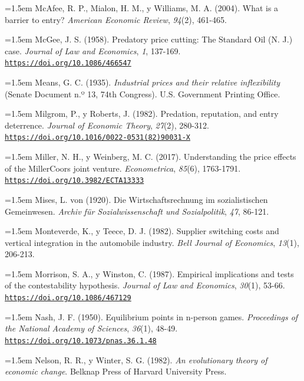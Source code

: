 \documentclass[10pt,a4paper]{article}
\begin{document}
\noindent\hangindent=1.5em McAfee, R. P., Mialon, H. M., y Williams, M. A. (2004). What is a barrier to entry? \textit{American Economic Review}, \textit{94}(2), 461-465.

\noindent\hangindent=1.5em McGee, J. S. (1958). Predatory price cutting: The Standard Oil (N. J.) case. \textit{Journal of Law and Economics}, \textit{1}, 137-169. \href{https://doi.org/10.1086/466547}{\nolinkurl{https://doi.org/10.1086/466547}}

\noindent\hangindent=1.5em Means, G. C. (1935). \textit{Industrial prices and their relative inflexibility} (Senate Document n.º 13, 74th Congress). U.S. Government Printing Office.

\noindent\hangindent=1.5em Milgrom, P., y Roberts, J. (1982). Predation, reputation, and entry deterrence. \textit{Journal of Economic Theory}, \textit{27}(2), 280-312. \href{https://doi.org/10.1016/0022-0531(82)90031-X}{\nolinkurl{https://doi.org/10.1016/0022-0531(82)90031-X}}

\noindent\hangindent=1.5em Miller, N. H., y Weinberg, M. C. (2017). Understanding the price effects of the MillerCoors joint venture. \textit{Econometrica}, \textit{85}(6), 1763-1791. \href{https://doi.org/10.3982/ECTA13333}{\nolinkurl{https://doi.org/10.3982/ECTA13333}}

\noindent\hangindent=1.5em Mises, L. von (1920). Die Wirtschaftsrechnung im sozialistischen Gemeinwesen. \textit{Archiv für Sozialwissenschaft und Sozialpolitik}, \textit{47}, 86-121.

\noindent\hangindent=1.5em Monteverde, K., y Teece, D. J. (1982). Supplier switching costs and vertical integration in the automobile industry. \textit{Bell Journal of Economics}, \textit{13}(1), 206-213.

\noindent\hangindent=1.5em Morrison, S. A., y Winston, C. (1987). Empirical implications and tests of the contestability hypothesis. \textit{Journal of Law and Economics}, \textit{30}(1), 53-66. \href{https://doi.org/10.1086/467129}{\nolinkurl{https://doi.org/10.1086/467129}}

\noindent\hangindent=1.5em Nash, J. F. (1950). Equilibrium points in n-person games. \textit{Proceedings of the National Academy of Sciences}, \textit{36}(1), 48-49. \href{https://doi.org/10.1073/pnas.36.1.48}{\nolinkurl{https://doi.org/10.1073/pnas.36.1.48}}

\noindent\hangindent=1.5em Nelson, R. R., y Winter, S. G. (1982). \textit{An evolutionary theory of economic change}. Belknap Press of Harvard University Press.
\end{document}
